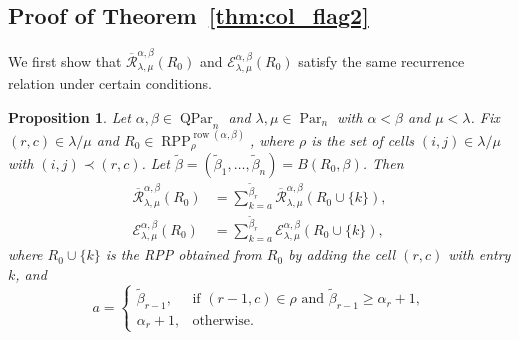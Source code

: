 \documentclass[12pt]{amsart}
\numberwithin{equation}{section}
\newtheorem{prop}[thm]{Proposition}
\theoremstyle{definition}
\newcommand\wb{\widetilde{\beta}}
\newcommand\row{\operatorname{row}}
\newcommand\Par{\operatorname{Par}}
\newcommand\QPar{\operatorname{QPar}}
\newcommand\RPP{\operatorname{RPP}}
\newcommand\lm{{\lambda/\mu}}
\newcommand\R{\mathcal{R}}
\newcommand\oR{\overline{\R}}
\newcommand\EE{\mathcal{E}}
\begin{document}
\subsection{Proof of Theorem~\ref{thm:col_flag2}}


We first show that $\oR^{\alpha,\beta}_{\lambda,\mu}(R_0)$ and
$\EE^{\alpha,\beta}_{\lambda,\mu}(R_0)$ satisfy the same recurrence relation
under certain conditions.

\begin{prop}\label{prop:rec RPP R0}
  Let $\alpha,\beta\in\QPar_n$ and $\lambda,\mu\in\Par_n$ with $\alpha<\beta$ and
  $\mu<\lambda$. Fix $(r,c)\in\lm$ and $R_0\in
  \RPP^{\row(\alpha,\beta)}_{\rho}$, where $\rho$ is the set of cells
  $(i,j)\in\lm$ with $(i,j)\prec(r,c)$. Let
  $\wb=(\wb_1,\dots,\wb_n)=B(R_0,\beta)$. Then
  \begin{align}
    \label{eq:rec M}
    \oR^{\alpha,\beta}_{\lambda,\mu}(R_0)
    &= \sum_{k=a}^{\wb_r} \oR^{\alpha,\beta}_{\lambda,\mu}(R_0\cup\{k\}),\\
    \label{eq:rec E}
    \EE^{\alpha,\beta}_{\lambda,\mu}(R_0)
    &= \sum_{k=a}^{\wb_r} \EE^{\alpha,\beta}_{\lambda,\mu}(R_0\cup\{k\}),
  \end{align}
  where $R_0\cup\{k\}$ is the RPP obtained from $R_0$ by adding the cell $(r,c)$
  with entry $k$, and
  \[
a = \begin{cases}
  \wb_{r-1}, &\mbox{if $(r-1,c)\in\rho$ and $\wb_{r-1}\ge\alpha_r+1$},\\
 \alpha_r+1, &\mbox{otherwise}.
\end{cases}
\]
\end{prop}
\end{document}
